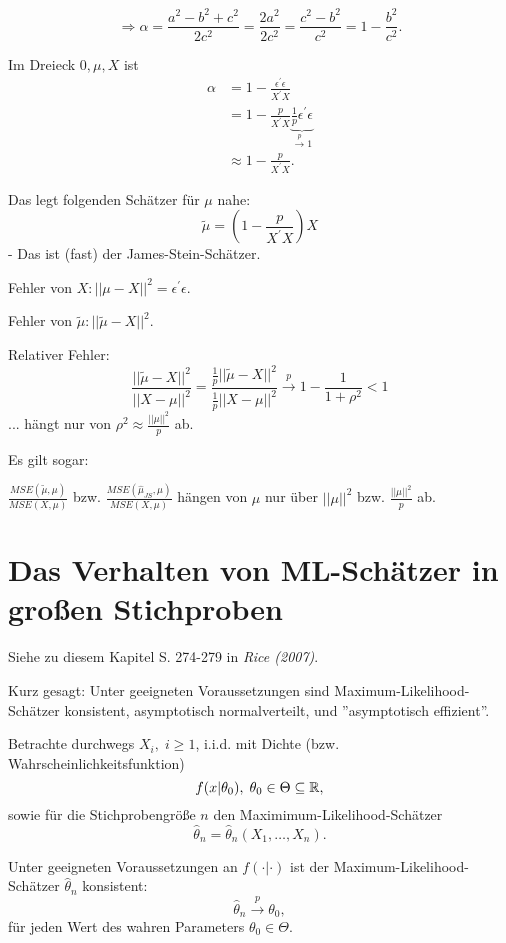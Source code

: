 \documentclass{tstextbook}
\begin{document}
	\[ \Rightarrow \alpha = \frac{a^2-b^2+c^2}{2c^2} = \frac{2a^2}{2c^2} = \frac{c^2-b^2}{c^2} = 1 - \frac{b^2}{c^2} . \] 
	
	Im Dreieck $ 0,\mu,X $ ist 
	\[
	\begin{aligned}
		\alpha & = 1- \frac{\epsilon^\prime\epsilon}{X^\prime X} \\
		& = 1 - \frac{p}{X^\prime X}\underbrace{\frac{1}{p}\epsilon^\prime\epsilon}_{\xrightarrow{p} 1} \\
		& \approx 1- \frac{p}{X^\prime X}.
	\end{aligned}
	\]
	
	Das legt folgenden Schätzer für $ \mu $ nahe:
	\[
	\tilde{\mu} = \left(1-\frac{p}{X^\prime X}\right)X
	\]
	- Das ist (fast) der James-Stein-Schätzer. 
	
	Fehler von $ X\colon ||\mu-X||^2 = \epsilon^\prime \epsilon $. 
	
	Fehler von $ \tilde{\mu}  \colon ||\tilde{\mu} -X||^2 $. 
	
	Relativer Fehler: 
	\[
	\frac{||\tilde{\mu}-X||^2}{||X-\mu||^2} = \frac{\frac{1}{p}||\tilde{\mu}-X||^2}{\frac{1}{p}||X-\mu||^2} \xrightarrow{p} 1-\frac{1}{1+\rho^2} < 1
	\]
	... hängt nur von $ \rho^2  \approx \frac{||\mu||^2}{p} $ ab.
	
	Es gilt sogar:
	
	$ \frac{MSE(\tilde{\mu},\mu)}{MSE(X,\mu)} $ bzw. 	$ \frac{MSE(\hat{\mu}_{JS},\mu)}{MSE(X,\mu)} $ hängen von $ \mu $ nur über $ ||\mu||^2 $ bzw. $ \frac{||\mu||^2}{p} $ ab.
	
	
	\section{Das Verhalten von ML-Schätzer in großen Stichproben}
	
	\begin{book} 
		Siehe zu diesem Kapitel S. 274-279 in	\textit{Rice (2007)}.
	\end{book}
	
	Kurz gesagt: Unter geeigneten Voraussetzungen sind Maximum-Likelihood-Schätzer konsistent, asymptotisch normalverteilt, und ''asymptotisch effizient''.
	
	Betrachte durchwegs $ X_i, \; i \ge 1 $, i.i.d. mit Dichte (bzw. Wahrscheinlichkeitsfunktion)
	\[
	f(x|\theta_0), \; \theta_0\in\Theta\subseteq\mathbb R,
	\] 
	sowie für die Stichprobengröße $ n $ den Maximimum-Likelihood-Schätzer 
	\[
	\hat{\theta}_n = \hat{\theta}_n\left(X_1,\ldots,X_n\right).
	\]
	
	\begin{satz}[Konsistenz]
		Unter geeigneten Voraussetzungen an $ f(\cdot|\cdot) $ ist der Maximum-Likelihood-Schätzer $ \hat{\theta}_n $ konsistent:
		\[
		\hat{\theta}_n \xrightarrow{p} \theta_0,
		\]
		für jeden Wert des wahren Parameters $ \theta_0\in\Theta $.
	\end{satz}
	
\end{document}
